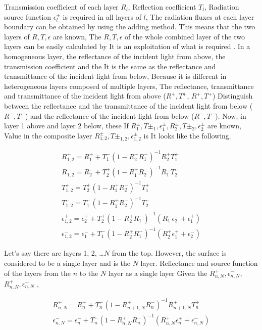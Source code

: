 Transmission coefficient of each layer \(R_l\), Reflection coefficient
\(T_l\), Radiation source function \(\epsilon^\pm_l\) is required in all
layers of \(l\), The radiation fluxes at each layer boundary can be
obtained by using the adding method. This means that the two layers of
\(R,T,\epsilon\) are known, The \(R,T,\epsilon\) of the whole combined
layer of the two layers can be easily calculated by It is an
exploitation of what is required . In a homogeneous layer, the
reflectance of the incident light from above, the transmission
coefficient and the It is the same as the reflectance and transmittance
of the incident light from below, Because it is different in
heterogeneous layers composed of multiple layers, The reflectance,
transmittance and transmittance of the incident light from above
(\(R^+, T^+\), \(R^+, T^+\)) Distinguish between the reflectance and the
transmittance of the incident light from below (\(R^-, T^-\)) and the
reflectance of the incident light from below (\(R^-, T^-\)). Now, in
layer 1 above and layer 2 below, these If
\(R^\pm_1, T\pm_1, \epsilon^\pm_1,  R^\pm_2, T\pm_2, \epsilon^\pm_2\)
are known, Value in the composite layer
\(R^\pm_{1,2}, T\pm_{1,2}, \epsilon^\pm_{1,2}\) is It looks like the
following.

\begin{eqnarray}
  R^+_{1,2}  =  R^+_1 + T^-_1 ( 1- R^+_2 R^-_1 )^{-1} R^+_2 T^+_1 \\
  R^-_{1,2}  =  R^-_2 + T^+_2 ( 1- R^+_1 R^-_2 )^{-1} R^-_1 T^-_2 \\
  T^+_{1,2}  =  T^+_2 ( 1- R^+_1 R^-_2 )^{-1} T^+_1 \\
  T^-_{1,2}  =  T^-_1 ( 1- R^+_1 R^-_2 )^{-1} T^-_2 \\
  \epsilon^+_{1,2}  =  \epsilon^+_2 
    + T^+_2 ( 1- R^+_2 R^-_1 )^{-1} ( R^-_1 \epsilon^-_2 + \epsilon^+_1 ) \\
  \epsilon^-_{1,2}  =  \epsilon^-_1 
    + T^-_1 ( 1- R^+_2 R^-_1 )^{-1} ( R^+_2 \epsilon^+_1 + \epsilon^-_2 ) 
\end{eqnarray}

Let's say there are layers 1, 2, \ldots{}\(N\) from the top. However,
the surface is considered to be a single layer and is the \(N\) layer.
Reflectance and source function of the layers from the \(n\) to the
\(N\) layer as a single layer Given the \(R^+_{n,N}, \epsilon^-_{n,N}\),
\(R^+_{n,N}, \epsilon^-_{n,N}\) ,

\begin{eqnarray}
  R^+_{n,N}  =  R^+_n 
      + T^-_n ( 1- R^+_{n+1,N} R^-_n )^{-1} R^+_{n+1,N} T^+_n \\
  \epsilon^-_{n,N}  =  \epsilon^-_n
    + T^-_n ( 1- R^+_{n,N} R^-_n )^{-1} 
      ( R^+_{n,N} \epsilon^+_n + \epsilon^-_{n,N} ) 
\end{eqnarray}

